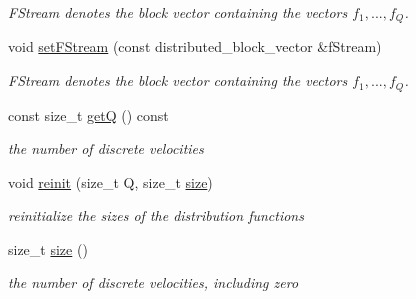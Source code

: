 \begin{DoxyCompactItemize}
\begin{DoxyCompactList}\small\item\em F\-Stream denotes the block vector containing the vectors $ f_1, ..., f_Q $. \end{DoxyCompactList}\item 
\hypertarget{classnatrium_1_1DistributionFunctions_ad0ada0c54968a61f78eb1b82eb6c5a68}{void \hyperlink{classnatrium_1_1DistributionFunctions_ad0ada0c54968a61f78eb1b82eb6c5a68}{set\-F\-Stream} (const distributed\-\_\-block\-\_\-vector \&f\-Stream)}\label{classnatrium_1_1DistributionFunctions_ad0ada0c54968a61f78eb1b82eb6c5a68}

\begin{DoxyCompactList}\small\item\em F\-Stream denotes the block vector containing the vectors $ f_1, ..., f_Q $. \end{DoxyCompactList}\item 
\hypertarget{classnatrium_1_1DistributionFunctions_ae0fd8e8234c7d5abec8522767d2a95e7}{const size\-\_\-t \hyperlink{classnatrium_1_1DistributionFunctions_ae0fd8e8234c7d5abec8522767d2a95e7}{get\-Q} () const }\label{classnatrium_1_1DistributionFunctions_ae0fd8e8234c7d5abec8522767d2a95e7}

\begin{DoxyCompactList}\small\item\em the number of discrete velocities \end{DoxyCompactList}\item 
\hypertarget{classnatrium_1_1DistributionFunctions_acaca68f7cbb9322d354ad6dca68b2cb2}{void \hyperlink{classnatrium_1_1DistributionFunctions_acaca68f7cbb9322d354ad6dca68b2cb2}{reinit} (size\-\_\-t Q, size\-\_\-t \hyperlink{classnatrium_1_1DistributionFunctions_a20accab9335de906696ad792164728ed}{size})}\label{classnatrium_1_1DistributionFunctions_acaca68f7cbb9322d354ad6dca68b2cb2}

\begin{DoxyCompactList}\small\item\em reinitialize the sizes of the distribution functions \end{DoxyCompactList}\item 
\hypertarget{classnatrium_1_1DistributionFunctions_a20accab9335de906696ad792164728ed}{size\-\_\-t \hyperlink{classnatrium_1_1DistributionFunctions_a20accab9335de906696ad792164728ed}{size} ()}\label{classnatrium_1_1DistributionFunctions_a20accab9335de906696ad792164728ed}

\begin{DoxyCompactList}\small\item\em the number of discrete velocities, including zero \end{DoxyCompactList}\end{DoxyCompactItemize}


